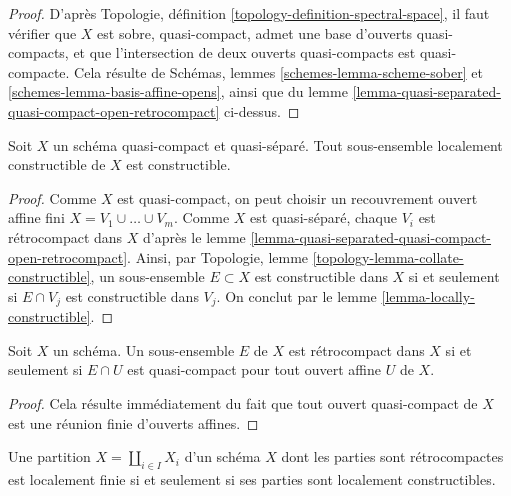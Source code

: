 \begin{proof}
D'après Topologie, définition \ref{topology-definition-spectral-space},
il faut vérifier que $X$ est sobre, quasi-compact, admet une
base d'ouverts quasi-compacts, et que l'intersection de deux
ouverts quasi-compacts est quasi-compacte. Cela résulte de
Schémas, lemmes \ref{schemes-lemma-scheme-sober} et
\ref{schemes-lemma-basis-affine-opens},
ainsi
que du lemme \ref{lemma-quasi-separated-quasi-compact-open-retrocompact}
ci-dessus.
\end{proof}

\begin{lemma}
\label{lemma-constructible-quasi-compact-quasi-separated}
Soit $X$ un schéma quasi-compact et quasi-séparé. Tout
sous-ensemble localement constructible de $X$ est constructible.
\end{lemma}

\begin{proof}
Comme $X$ est quasi-compact, on peut choisir un recouvrement ouvert affine fini
$X = V_1 \cup \ldots \cup V_m$. Comme $X$ est quasi-séparé, chaque $V_i$ est
rétrocompact dans $X$ d'après
le lemme \ref{lemma-quasi-separated-quasi-compact-open-retrocompact}.
Ainsi,
par Topologie, lemme \ref{topology-lemma-collate-constructible},
un sous-ensemble $E \subset X$ est constructible dans $X$ si et seulement si
$E \cap V_j$ est constructible dans $V_j$. On conclut par le
lemme \ref{lemma-locally-constructible}.
\end{proof}

\begin{lemma}
\label{lemma-retrocompact}
Soit $X$ un schéma. Un sous-ensemble $E$ de $X$ est rétrocompact dans $X$ si et seulement si
$E \cap U$ est quasi-compact pour tout ouvert affine $U$ de $X$.
\end{lemma}

\begin{proof}
Cela résulte immédiatement du fait que tout ouvert quasi-compact de $X$ est une
réunion finie d'ouverts affines.
\end{proof}

\begin{lemma}
\label{lemma-stratification-locally-finite-constructible}
Une partition $X = \coprod_{i \in I} X_i$ d'un schéma $X$ dont
les parties sont rétrocompactes est localement finie si et seulement si ses
parties sont localement constructibles.
\end{lemma}

